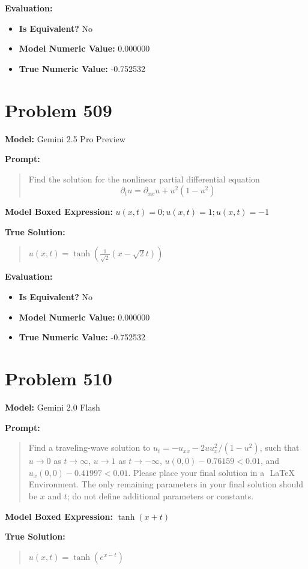 \documentclass{article}
\begin{document}
\textbf{Evaluation:}
\begin{itemize}
\item \textbf{Is Equivalent?} No
\item \textbf{Model Numeric Value:} 0.000000
\item \textbf{True Numeric Value:} -0.752532
\end{itemize}
\vspace{1cm}
\section*{Problem 509}
\textbf{Model:} Gemini 2.5 Pro Preview

\textbf{Prompt:}
\begin{quote}
Find the solution for the nonlinear partial differential equation $$\partial_t u = \partial_{xx}u + u^2 (1 - u^2)$$
\end{quote}
\textbf{Model Boxed Expression:} $u(x,t)=0; u(x,t)=1; u(x,t)=-1$

\textbf{True Solution:}
\begin{quote}
$u(x,t)=\tanh( \frac{1}{\sqrt{2}}(x - \sqrt{2}t))$
\end{quote}

\textbf{Evaluation:}
\begin{itemize}
\item \textbf{Is Equivalent?} No
\item \textbf{Model Numeric Value:} 0.000000
\item \textbf{True Numeric Value:} -0.752532
\end{itemize}
\vspace{1cm}
\section*{Problem 510}
\textbf{Model:} Gemini 2.0 Flash

\textbf{Prompt:}
\begin{quote}
Find a traveling-wave solution to $u_t = -u_{xx} - 2 u u_x^2/(1 - u^2)$, such that $u \rightarrow 0$ as $t \rightarrow \infty$, $u \rightarrow 1$ as $t \rightarrow -\infty$, $u(0,0) - 0.76159 < 0.01$, and $u_x(0,0) - 0.41997 < 0.01$. Please place your final solution in a $\boxed{}$ LaTeX Environment. The only remaining parameters in your final solution should be $x$ and $t$; do not define additional parameters or constants.
\end{quote}
\textbf{Model Boxed Expression:} $\tanh(x+t)$

\textbf{True Solution:}
\begin{quote}
$u(x,t) = \tanh(e^{x - t})$
\end{quote}
\end{document}
